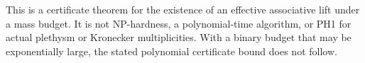 This is a certificate theorem for the existence of an
effective associative lift under a mass budget. It is
not NP-hardness, a polynomial-time algorithm, or PH1 for
actual plethysm or Kronecker multiplicities. With a binary
budget that may be exponentially large, the stated
polynomial certificate bound does not follow.

